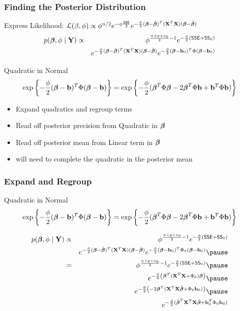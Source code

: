 \documentclass[handout]{beamer}
\begin{document}
\begin{frame}
\frametitle{Finding the Posterior Distribution}
Express Likelihood: ${\cal{L}}(\beta, \phi) \propto \phi^{n/2} e^{- \phi \frac{\textsf{SSE}}{2}}
e^{-\frac{\phi}{2} (\boldsymbol{\beta} - \hat{\boldsymbol{\beta}})^T(\mathbf{X}^T\mathbf{X}) (\boldsymbol{\beta} - \hat{\boldsymbol{\beta}})}$ \pause
\begin{eqnarray*}
 p(\boldsymbol{\beta}, \phi \mid \mathbf{Y}) &\propto&  \phi^{\frac {n + p + \nu_0}{ 2} - 1}
 e^{- \frac \phi 2 ( \textsf{SSE} + \textsf{SS}_0) } \\
 & & e^{-\frac{\phi}{2} (\boldsymbol{\beta} - \hat{\boldsymbol{\beta}})^T(\mathbf{X}^T\mathbf{X}) (\boldsymbol{\beta} - \hat{\boldsymbol{\beta}})}
 e^{- \frac{\phi}{2} (\boldsymbol{\beta} - \mathbf{b}_0)^T \Phi (\boldsymbol{\beta} - \mathbf{b}_0) }  
\end{eqnarray*} \pause

Quadratic in Normal
$$\exp\left\{- \frac{\phi}{2} (\boldsymbol{\beta} - \mathbf{b})^T \Phi (\boldsymbol{\beta} - \mathbf{b}) \right\} = \exp\left\{-
  \frac{\phi}{2} (\boldsymbol{\beta}^T \Phi \boldsymbol{\beta} - 2 \boldsymbol{\beta}^T \Phi \mathbf{b} + \mathbf{b}^T\Phi \mathbf{b} )\right\}$$
\pause

  \begin{itemize}
  \item Expand quadratics and regroup terms \pause 
  \item Read off posterior precision from Quadratic in $\boldsymbol{\beta}$ \pause 
  \item Read off posterior mean from Linear term in $\boldsymbol{\beta}$ \pause 
  \item will need to complete the quadratic in the posterior mean
  \end{itemize}
\end{frame}
\begin{frame}
  \frametitle{ Expand and Regroup}
  Quadratic in Normal
$$\exp\left\{- \frac{\phi}{2} (\boldsymbol{\beta} - \mathbf{b})^T \Phi (\boldsymbol{\beta} - \mathbf{b}) \right\} = \exp\left\{-
  \frac{\phi}{2} (\boldsymbol{\beta}^T \Phi \boldsymbol{\beta} - 2 \boldsymbol{\beta}^T \Phi \mathbf{b} + \mathbf{b}^T\Phi \mathbf{b} )\right\}$$
\pause 

\begin{eqnarray*}
 p(\b, \phi \mid \Y) &\propto&  \phi^{\frac {n + p + \nu_0}{ 2} - 1}
 e^{- \frac \phi 2 ( \SSE + \SS_0) }  \\
 & & e^{-\frac{\phi}{2} (\b - \bhat)^T(\X^T\X) (\b - \bhat)}
 e^{- \frac{\phi}{2} (\b - \bv_0)^T \Phi_0 (\b - \bv_0) } \pause  \\ 
 & = & \phi^{\frac {n + p + \nu_0}{ 2} - 1}
 e^{- \frac \phi 2 ( \SSE + \SS_0) } \pause \\
& &  e^{ -\frac{\phi}{2} \left(  \b^T (\X^T\X + \Phi_0) \b  \right) } \pause \\
& &  e^{  -\frac{\phi}{2} \left( -2 \b^T (\X^T\X \bhat  + \Phi_0 \bv_0)
   \right)} \pause \\
& &  e^{  -\frac{\phi}{2} (\bhat^T \X^T\X \bhat + \bv_0^T \Phi_0 \bv_0
  )}
\end{eqnarray*}




\end{frame}
\end{document}
